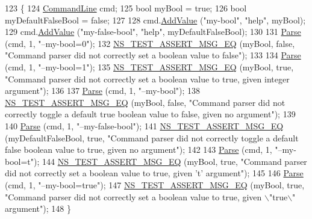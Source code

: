 \begin{DoxyCode}
123 \{
124   \hyperlink{classns3_1_1CommandLine}{CommandLine} cmd;
125   \textcolor{keywordtype}{bool} myBool = \textcolor{keyword}{true};
126   \textcolor{keywordtype}{bool} myDefaultFalseBool = \textcolor{keyword}{false};
127 
128   cmd.\hyperlink{classns3_1_1CommandLine_addcfb546c7ad4c8bd0965654d55beb8e}{AddValue} (\textcolor{stringliteral}{"my-bool"}, \textcolor{stringliteral}{"help"}, myBool);
129   cmd.\hyperlink{classns3_1_1CommandLine_addcfb546c7ad4c8bd0965654d55beb8e}{AddValue} (\textcolor{stringliteral}{"my-false-bool"}, \textcolor{stringliteral}{"help"}, myDefaultFalseBool);
130 
131   \hyperlink{classCommandLineTestCaseBase_aa8bbc2d366637977fd21170282baaa0c}{Parse} (cmd, 1, \textcolor{stringliteral}{"--my-bool=0"});
132   \hyperlink{group__testing_ga2a9d78cffb3db8e867c35fff0b698cf5}{NS\_TEST\_ASSERT\_MSG\_EQ} (myBool, \textcolor{keyword}{false}, \textcolor{stringliteral}{"Command parser did not correctly set a
       boolean value to false"});
133 
134   \hyperlink{classCommandLineTestCaseBase_aa8bbc2d366637977fd21170282baaa0c}{Parse} (cmd, 1, \textcolor{stringliteral}{"--my-bool=1"});
135   \hyperlink{group__testing_ga2a9d78cffb3db8e867c35fff0b698cf5}{NS\_TEST\_ASSERT\_MSG\_EQ} (myBool, \textcolor{keyword}{true}, \textcolor{stringliteral}{"Command parser did not correctly set a boolean
       value to true, given integer argument"});
136 
137   \hyperlink{classCommandLineTestCaseBase_aa8bbc2d366637977fd21170282baaa0c}{Parse} (cmd, 1, \textcolor{stringliteral}{"--my-bool"});
138   \hyperlink{group__testing_ga2a9d78cffb3db8e867c35fff0b698cf5}{NS\_TEST\_ASSERT\_MSG\_EQ} (myBool, \textcolor{keyword}{false}, \textcolor{stringliteral}{"Command parser did not correctly toggle a
       default true boolean value to false, given no argument"});
139 
140   \hyperlink{classCommandLineTestCaseBase_aa8bbc2d366637977fd21170282baaa0c}{Parse} (cmd, 1, \textcolor{stringliteral}{"--my-false-bool"});
141   \hyperlink{group__testing_ga2a9d78cffb3db8e867c35fff0b698cf5}{NS\_TEST\_ASSERT\_MSG\_EQ} (myDefaultFalseBool, \textcolor{keyword}{true}, \textcolor{stringliteral}{"Command parser did not correctly
       toggle a default false boolean value to true, given no argument"});
142 
143   \hyperlink{classCommandLineTestCaseBase_aa8bbc2d366637977fd21170282baaa0c}{Parse} (cmd, 1, \textcolor{stringliteral}{"--my-bool=t"});
144   \hyperlink{group__testing_ga2a9d78cffb3db8e867c35fff0b698cf5}{NS\_TEST\_ASSERT\_MSG\_EQ} (myBool, \textcolor{keyword}{true}, \textcolor{stringliteral}{"Command parser did not correctly set a boolean
       value to true, given 't' argument"});
145 
146   \hyperlink{classCommandLineTestCaseBase_aa8bbc2d366637977fd21170282baaa0c}{Parse} (cmd, 1, \textcolor{stringliteral}{"--my-bool=true"});
147   \hyperlink{group__testing_ga2a9d78cffb3db8e867c35fff0b698cf5}{NS\_TEST\_ASSERT\_MSG\_EQ} (myBool, \textcolor{keyword}{true}, \textcolor{stringliteral}{"Command parser did not correctly set a boolean
       value to true, given \(\backslash\)"true\(\backslash\)" argument"});
148 \}
\end{DoxyCode}



